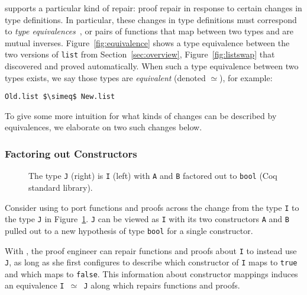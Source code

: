 \toolname supports a particular kind of repair: proof repair in response to certain changes in type definitions.
In particular, these changes in type definitions must correspond to \textit{type equivalences}~\cite{univalent2013homotopy},
or pairs of functions that map between two types and are mutual inverses.
Figure~\ref{fig:equivalence} shows a type equivalence between the two versions of \lstinline{list}
from Section~\ref{sec:overview}, Figure~\ref{fig:listswap} that \toolname discovered and proved automatically.
When such a type equivalence between two types exists, we say those types are \textit{equivalent} (denoted $\simeq$), for example:

\begin{lstlisting}
Old.list $\simeq$ New.list
\end{lstlisting}

To give some more intuition for what kinds of changes can be described by equivalences, we elaborate on two such changes below.

\subsubsection{Factoring out Constructors}
\label{sec:ex1}

\begin{figure}
\begin{minipage}{0.48\columnwidth}

\end{minipage}
\hfill
\begin{minipage}{0.48\columnwidth}

\end{minipage}
\vspace{-0.3cm}
\caption{The type \lstinline{J} (right) is \lstinline{I} (left) with \lstinline{A} and \lstinline{B} factored out to \lstinline{bool} (Coq standard library).}
\label{fig:equivalence2}
\end{figure}

Consider using \toolname to port functions and proofs across the change from the type \lstinline{I} to the type \lstinline{J} 
in Figure~\ref{fig:equivalence2}.
\lstinline{J} can be viewed as \lstinline{I} with its two constructors \lstinline{A} and \lstinline{B} pulled out to a
new hypothesis of type \lstinline{bool} for a single constructor.

With \toolname, the proof engineer can repair functions and proofs about \lstinline{I} to instead use \lstinline{J},
as long as she first configures \toolname to describe which constructor 
of \lstinline{I} maps to \lstinline{true} and which maps to \lstinline{false}.
This information about constructor mappings induces an equivalence \lstinline{I }$\simeq$\lstinline{ J}
along which \toolname repairs functions and proofs.

